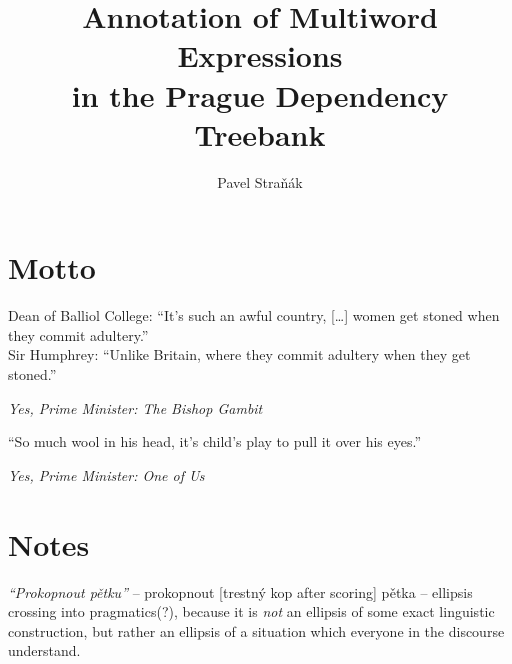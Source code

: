 \documentclass[11pt, a4paper, twopage, titlepage]{book}
\title{Annotation of Multiword Expressions\\
 in the Prague Dependency Treebank}
\author{Pavel Straňák}
\begin{document}
\maketitle

\frontmatter
\tableofcontents
\listoffigures
\listoftables

\section*{Motto}

\noindent
Dean of Balliol College:  ``It's such an awful country, [\ldots] women get stoned when they commit adultery.'' \\
Sir Humphrey: ``Unlike Britain, where they commit adultery when they get stoned.''
\begin{flushright}
\emph{Yes, Prime Minister: The Bishop Gambit}
\end{flushright}

\vspace{1cm}
\noindent
``So much wool in his head, it's child's play to pull it over his eyes.''
\begin{flushright}
\emph{Yes, Prime Minister: One of Us}
\end{flushright}




\newpage
\section{Notes}

{\em``Prokopnout pětku''} -- prokopnout [trestný kop after scoring] pětka -- ellipsis crossing into pragmatics(?), because it is {\em not} an ellipsis of some exact linguistic construction, but rather an ellipsis of a situation which everyone in the discourse understand.  
\end{document}
